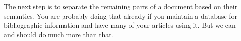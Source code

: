 
The next step is to separate the remaining parts of a document based 
on their semantics. You are probably doing that already if you 
maintain a database for bibliographic information and have many of 
your articles using it. But we can and should do much more than that.